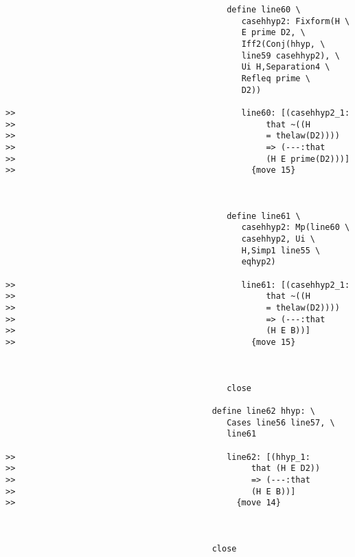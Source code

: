\documentclass[12pt]{article}
\begin{document}
\begin{verbatim}
                                             define line60 \
                                                casehhyp2: Fixform(H \
                                                E prime D2, \
                                                Iff2(Conj(hhyp, \
                                                line59 casehhyp2), \
                                                Ui H,Separation4 \
                                                Refleq prime \
                                                D2))

>>                                              line60: [(casehhyp2_1:
>>                                                   that ~((H
>>                                                   = thelaw(D2))))
>>                                                   => (---:that
>>                                                   (H E prime(D2)))]
>>                                                {move 15}



                                             define line61 \
                                                casehhyp2: Mp(line60 \
                                                casehhyp2, Ui \
                                                H,Simp1 line55 \
                                                eqhyp2)

>>                                              line61: [(casehhyp2_1:
>>                                                   that ~((H
>>                                                   = thelaw(D2))))
>>                                                   => (---:that
>>                                                   (H E B))]
>>                                                {move 15}



                                             close

                                          define line62 hhyp: \
                                             Cases line56 line57, \
                                             line61

>>                                           line62: [(hhyp_1:
>>                                                that (H E D2))
>>                                                => (---:that
>>                                                (H E B))]
>>                                             {move 14}



                                          close


\end{verbatim}
\end{document}

